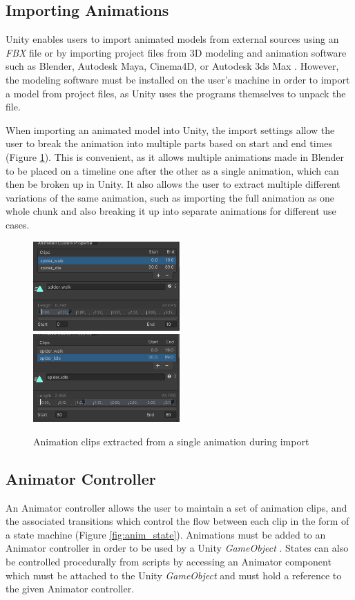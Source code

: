 \subsection{Importing Animations}
Unity enables users to import animated models from external sources using an
\textit{FBX} file or by importing project files from 3D modeling and animation
software such as Blender, Autodesk Maya, Cinema4D, or Autodesk 3ds Max
\cite{unity_import}. However, the modeling software must be installed on the
user's machine in order to import a model from project files, as Unity uses the
programs themselves to unpack the file. 

When importing an animated model into Unity, the import settings allow the user
to break the animation into multiple parts based on start and end times (Figure
\ref{fig:anim_chunk}). This is convenient, as it allows multiple animations made
in Blender to be placed on a timeline one after the other as a single
animation, which can then be broken up in Unity. It also allows the user to
extract multiple different variations of the same animation, such as importing
the full animation as one whole chunk and also breaking it up into separate
animations for different use cases.

\begin{figure}
    \includegraphics[width=0.5\textwidth]{grafika/animation_chunk_1.png}
    \includegraphics[width=0.5\textwidth]{grafika/animation_chunk_2.png}
    \caption{Animation clips extracted from a single animation during import}
    \label{fig:anim_chunk}
\end{figure}

\subsection{Animator Controller}
An Animator controller allows the user to maintain a set of animation clips, and
the associated transitions which control the flow between each clip in the form of
a state machine (Figure \ref{fig:anim_state}). Animations must be added to an
Animator controller in order to be used by a Unity \textit{GameObject}
\cite{unity_animator}. States can also be controlled procedurally from scripts
by accessing an Animator component which must be attached to the Unity
\textit{GameObject} and must hold a reference to the given Animator controller.
 
